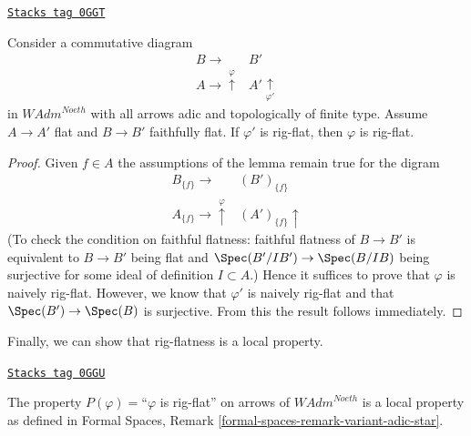 \begin{lemma}
\label{restricted-lemma-rig-flat-local-down}
\href{https://stacks.math.columbia.edu/tag/0GGT}{\texttt{Stacks tag 0GGT}}

Consider a commutative diagram
$$
\begin{array}{cc}B \longrightarrow & B' \\ A \longrightarrow\overset{\varphi}{\uparrow} & A' \underset{\varphi'}{\uparrow}\end{array}
$$
in $\textit{WAdm}^{Noeth}$ with all arrows adic and topologically
of finite type. Assume $A \to A'$ flat and $B \to B'$ faithfully flat.
If $\varphi'$ is rig-flat, then $\varphi$ is rig-flat.
\end{lemma}

\begin{proof}
Given $f \in A$ the assumptions of the lemma remain true for the digram
$$
\begin{array}{cc}B_{\{f\}} \longrightarrow & (B')_{\{f\}} \\ A_{\{f\}} \longrightarrow\overset{\varphi}{\uparrow} & (A')_{\{f\}} \uparrow\end{array}
$$
(To check the condition on faithful flatness: faithful flatness
of $B \to B'$ is equivalent to $B \to B'$ being flat and
$\Spec(B'/IB') \to \Spec(B/IB)$ being
surjective for some ideal of definition $I \subset A$.)
Hence it suffices to prove that $\varphi$ is naively rig-flat.
However, we know that $\varphi'$ is naively rig-flat and
that $\Spec(B') \to \Spec(B)$ is surjective. From this the
result follows immediately.
\end{proof}

Finally, we can show that rig-flatness is a local property.

\begin{lemma}
\label{restricted-lemma-rig-flat-axioms}
\href{https://stacks.math.columbia.edu/tag/0GGU}{\texttt{Stacks tag 0GGU}}

The property $P(\varphi)=$``$\varphi$ is rig-flat'' on arrows
of $\textit{WAdm}^{Noeth}$ is a local property as defined in
Formal Spaces, Remark \ref{formal-spaces-remark-variant-adic-star}.
\end{lemma}

